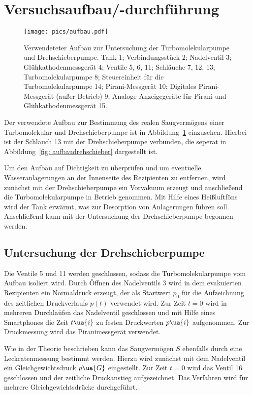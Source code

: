 \section{Versuchsaufbau/-durchführung}
\begin{figure}
  \centering
  \texttt{[image: pics/aufbau.pdf]}
  \caption{Verwendeteter Aufbau zur Untersuchung der Turbomolekularpumpe und Drehschieberpumpe.
Tank 1; Verbindungsstück 2; Nadelventil 3; Glühkathodenmessgerät 4;
Ventile 5, 6, 11; Schläuche 7, 12, 13; Turbomolekularpumpe 8; Steuereinheit für die Turbomolekularpumpe 14;
Pirani-Messgerät 10; Digitales Pirani-Messgerät (außer Betrieb) 9; Analoge Anzeigegeräte für Pirani und Glühkathodenmessgerät 15.}
  \label{fig: aufbau}
\end{figure}
Der verwendete Aufbau zur Bestimmung des realen Saugvermögens einer Turbomolekular und Drehschieberpumpe ist in
Abbildung~\ref{fig: aufbau} einzusehen. Hierbei ist der Schlauch 13 mit der Drehschieberpumpe verbunden, die seperat in
Abbildung~\ref{fig: aufbaudrehschieber} dargestellt ist.

Um den Aufbau auf Dichtigkeit zu überprüfen und um eventuelle Wasseranlagerungen an der Innenseite des Rezipienten zu entfernen,
wird zunächst mit der Drehschieberpumpe ein Vorvakuum erzeugt und anschließend die Turbomolekularpumpe in Betrieb genommen. Mit Hilfe
eines Heißluftföns wird der Tank erwärmt, was zur Desorption von Anlagerungen führen soll. Anschließend kann mit der Untersuchung der
Drehschieberpumpe begonnen werden.
\subsection{Untersuchung der Drehschieberpumpe}
Die Ventile 5 und 11 werden geschlossen, sodass die Turbomolekularpumpe vom Aufbau isoliert wird. Durch Öffnen des Nadelventils 3
wird in dem evakuierten Rezipienten ein Normaldruck erzeugt, der als Startwert $p_0$ für die Aufzeichnung des zeitlichen Druckverlaufs
$p(t)$ verwendet wird. Zur Zeit $t = 0$ wird in mehreren Durchlaüfen das Nadelventil geschlossen
und mit Hilfe eines Smartphones die Zeit $t\ua{i}$ zu festen Druckwerten $p\ua{i}$ aufgenommen. Zur Druckmessung wird das Piranimessgerät
verwendet.

Wie in der Theorie beschrieben kann das Saugvermögen $S$ ebenfalls durch eine Leckratenmessung bestimmt werden. Hierzu wird zunächst mit
dem Nadelventil ein Gleichgewichtsdruck $p\ua{G}$ eingestellt. Zur Zeit $t = 0$ wird das Ventil 16 geschlossen und der zeitliche
Druckanstieg aufgezeichnet. Das Verfahren wird für mehrere Gleichgewichtsdrücke durchgeführt.

